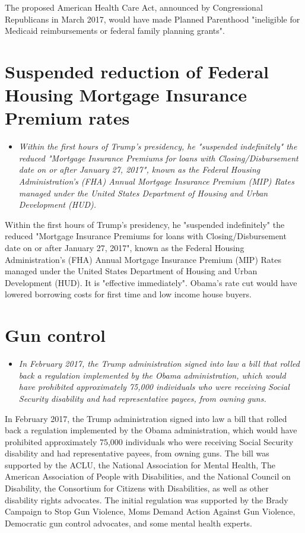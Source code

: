 The proposed American Health Care Act, announced by Congressional
Republicans in March 2017, would have made Planned Parenthood
"ineligible for Medicaid reimbursements or federal family planning
grants".

\section{Suspended reduction of Federal Housing Mortgage Insurance
Premium
rates}\label{suspended-reduction-of-federal-housing-mortgage-insurance-premium-rates}

\begin{itemize}
\item
  \emph{Within the first hours of Trump's presidency, he "suspended
  indefinitely" the reduced "Mortgage Insurance Premiums for loans with
  Closing/Disbursement date on or after January 27, 2017", known as the
  Federal Housing Administration's (FHA) Annual Mortgage Insurance
  Premium (MIP) Rates managed under the United States Department of
  Housing and Urban Development (HUD).}
\end{itemize}

Within the first hours of Trump's presidency, he "suspended
indefinitely" the reduced "Mortgage Insurance Premiums for loans with
Closing/Disbursement date on or after January 27, 2017", known as the
Federal Housing Administration's (FHA) Annual Mortgage Insurance Premium
(MIP) Rates managed under the United States Department of Housing and
Urban Development (HUD). It is "effective immediately". Obama's rate cut
would have lowered borrowing costs for first time and low income house
buyers.

\section{Gun control}\label{gun-control}

\begin{itemize}
\item
  \emph{In February 2017, the Trump administration signed into law a
  bill that rolled back a regulation implemented by the Obama
  administration, which would have prohibited approximately 75,000
  individuals who were receiving Social Security disability and had
  representative payees, from owning guns.}
\end{itemize}

In February 2017, the Trump administration signed into law a bill that
rolled back a regulation implemented by the Obama administration, which
would have prohibited approximately 75,000 individuals who were
receiving Social Security disability and had representative payees, from
owning guns. The bill was supported by the ACLU, the National
Association for Mental Health, The American Association of People with
Disabilities, and the National Council on Disability, the Consortium for
Citizens with Disabilities, as well as other disability rights
advocates. The initial regulation was supported by the Brady Campaign to
Stop Gun Violence, Moms Demand Action Against Gun Violence, Democratic
gun control advocates, and some mental health experts.

